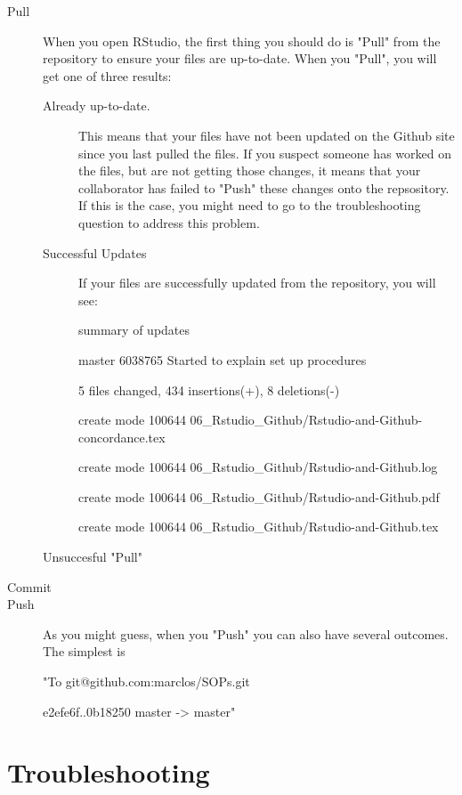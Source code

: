 \documentclass{article}
\begin{document}
\begin{description}
  \item[Pull] When you open RStudio, the first thing you should do is "Pull" from the repository to ensure your files are up-to-date. When you "Pull", you will get one of three results:
  
  \begin{description}
  \item[Already up-to-date.] This means that your files have not been updated on the Github site since you last pulled the files. If you suspect someone has worked on the files, but are not getting those changes, it means that your collaborator has failed to "Push" these changes onto the repsository. If this is the case, you might need to go to the troubleshooting question to address this problem.
  \item[Successful Updates] If your files are successfully updated from the repository, you will see:
  
summary of updates

master 6038765 Started to explain set up procedures
 
 5 files changed, 434 insertions(+), 8 deletions(-)
 
 create mode 100644 06\_Rstudio\_Github/Rstudio-and-Github-concordance.tex
 
 create mode 100644 06\_Rstudio\_Github/Rstudio-and-Github.log
 
 create mode 100644 06\_Rstudio\_Github/Rstudio-and-Github.pdf
 
 create mode 100644 06\_Rstudio\_Github/Rstudio-and-Github.tex
 
 \item[Unsuccesful "Pull"]
 
 
\end{description}

  \item[Commit]
  \item[Push] As you might guess, when you "Push" you can also have several outcomes. The simplest is 
  
  "To git@github.com:marclos/SOPs.git
  
   e2efe6f..0b18250  master -> master"
   
\end{description}

\section{Troubleshooting}
\end{document}
